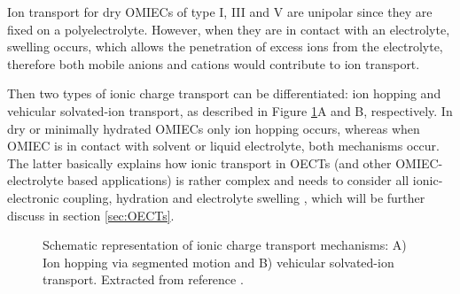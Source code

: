 Ion transport for dry OMIECs of type I, III and V are unipolar since they are fixed on a polyelectrolyte.  However, when they are in contact with an electrolyte, swelling occurs, which allows the penetration of excess ions from the electrolyte, therefore both mobile anions and cations would contribute to ion transport. 

Then two types of ionic charge transport can be differentiated: ion hopping and vehicular solvated-ion transport, as described in Figure \ref{fig:itrans}A and B, respectively. In dry or minimally hydrated OMIECs only ion hopping occurs, whereas when OMIEC is in contact with solvent or liquid electrolyte, both mechanisms occur. The latter basically explains how ionic transport in OECTs (and other OMIEC-electrolyte based applications) is rather complex and needs to consider all ionic-electronic coupling, hydration and electrolyte swelling \cite{paulsenOrganicMixedIonic2020}, which will be further discuss in section \ref{sec:OECTs}.

\begin{figure}[h]
	\centering
	\hspace{2em}
	\caption[Ionic transport mechanisms in OMIECs]{Schematic representation of ionic charge transport mechanisms: A) Ion hopping via segmented motion and B) vehicular solvated-ion transport. Extracted from reference \cite{paulsenOrganicMixedIonic2020}.}
	\label{fig:itrans}
\end{figure}

